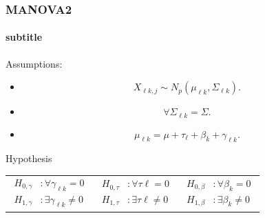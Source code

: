 \documentclass[aspectratio=169,10pt,t]{beamer}
\begin{document}
\begin{frame}[t]
	\frametitle{MANOVA2}
	\framesubtitle{subtitle}

	Assumptions:
	\begin{itemize}
		\item 
			\[
				X_{\ell k,j} \sim N_{p}  \left( \mu_{\ell k}, \Sigma_{\ell k}  \right) 
			.\] 
		\item 
			\[
				\forall \Sigma_{\ell k} = \Sigma
			.\] 
		\item 
			\[
			\mu_{\ell k} = \mu + \tau_{\ell} + \beta_{k} + \gamma_{\ell k}
			.\] 
	\end{itemize}

	Hypothesis\\
	\begin{centering}
		
	\begin{tabular}{ccc}
		$
		\begin{aligned}
			H_{0,\gamma} &: \forall \gamma_{\ell k} = 0\\
			H_{1,\gamma} &: \exists \gamma_{\ell k} \neq 0
		\end{aligned}
		$ & $
		\begin{aligned}
			H_{0,\tau} &: \forall \tau{\ell} = 0\\
			H_{1,\tau} &: \exists \tau{\ell} \neq 0
		\end{aligned}
			$	& $
		\begin{aligned}
			H_{0,\beta} &: \forall \beta_{k} = 0\\
			H_{1,\beta} &: \exists \beta_{k} \neq 0
		\end{aligned}
				$
	\end{tabular}
		\end{centering}
\end{frame}
\end{document}
